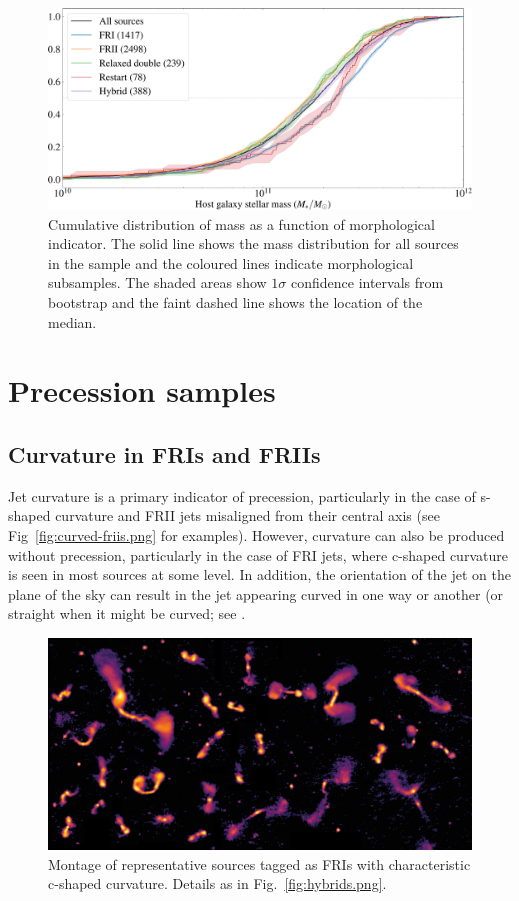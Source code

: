 \documentclass{aa}
\begin{document}
\begin{figure}
\includegraphics[width=\linewidth]{Images/results/mass_mainclass-crop.pdf}
\caption{Cumulative distribution of mass as a function of morphological indicator. The solid line shows the mass distribution for all sources in the sample and the coloured lines indicate morphological subsamples. The shaded areas show $1\sigma$ confidence intervals from bootstrap and the faint dashed line shows the location of the median.}
\label{fig:massdist-mainclass}
\end{figure}

\section{Precession samples}
\subsection{Curvature in FRIs and FRIIs}
Jet curvature is a primary indicator of precession, particularly in the case of s-shaped curvature and FRII jets misaligned from their central axis (see Fig~\ref{fig:curved-friis.png} for examples). However, curvature can also be produced without precession, particularly in the case of FRI jets, where c-shaped curvature is seen in most sources at some level. In addition, the orientation of the jet on the plane of the sky can result in the jet appearing curved in one way or another (or straight when it might be curved; see \cite{horton20b}. 

\begin{figure}
\includegraphics[width=1\linewidth]{Images/galaxies/curved-fris.png}
\caption{Montage of representative sources tagged as FRIs with characteristic c-shaped curvature. Details as in Fig.\ \ref{fig:hybrids.png}.}
\label{fig:curved-fris.png}
\end{figure}
\end{document}

